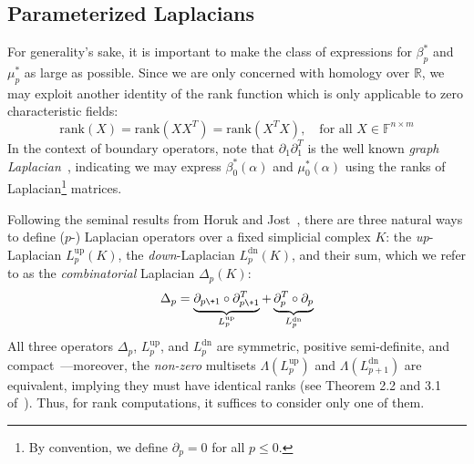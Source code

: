 \subsection{Parameterized Laplacians}\label{sec:laplacian_theory2}
 For generality's sake, it is important to make the class of expressions for $\beta_p^\ast$ and $\mu_p^\ast$ as large as possible.
Since we are only concerned with homology over $\mathbb{R}$, we may exploit another identity of the rank function which is only applicable to zero characteristic fields: 
$$\mathrm{rank}(X) = \mathrm{rank}(X X^T) = \mathrm{rank}(X^T X), \quad \text{for all } X \in \mathbb{F}^{n \times m}$$ 
In the context of boundary operators, note that $\partial_1 \partial_1^T$ is the well known \emph{graph Laplacian}~\cite{chung1997spectral}, indicating we may express $\beta_0^\ast(\alpha)$ and $\mu_0^\ast(\alpha)$ using the ranks of Laplacian\footnote{By convention, we define $\partial_p = 0$ for all $p \leq 0$.} matrices.

Following the seminal results from Horuk and Jost~\cite{horak2013spectra}, there are three natural ways to define ($p$-) Laplacian operators over a fixed simplicial complex $K$: the \emph{up}-Laplacian $L_p^{\text{up}}(K)$, the \emph{down}-Laplacian $L_p^{\text{dn}}(K)$, and their sum, which we refer to as the \emph{combinatorial} Laplacian $\Delta_p(K)$: 
\begin{equation}\label{eq:comb_lap}
	\Delta_p = \underbrace{\partial_{p\+1} \circ \partial_{p\+1}^T}_{L_p^{\text{up}}} + \underbrace{\partial_{p}^T  \circ  \partial_{p}}_{L_p^{\text{dn}}} 
\end{equation}
\noindent 
All three operators $\Delta_p$, $L_p^{\text{up}}$, and $L_p^{\text{dn}}$ are symmetric, positive semi-definite, and compact~\cite{memoli2022persistent}---moreover, the \emph{non-zero} multisets $\Lambda(L_p^{\text{up}})$ and $\Lambda(L_{p+1}^{\text{dn}})$ are equivalent, implying they must have identical ranks (see Theorem 2.2 and 3.1 of~\cite{horak2013spectra}). 
Thus, for rank computations, it suffices to consider only one of them.

